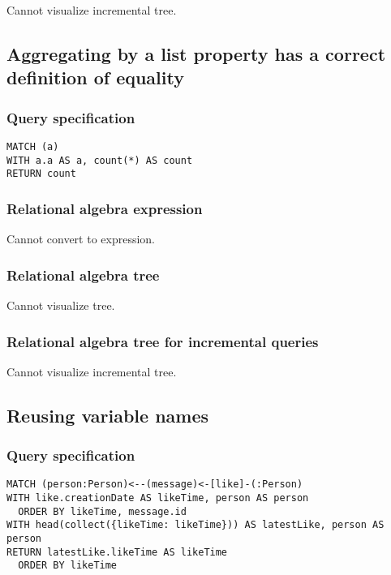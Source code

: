 Cannot visualize incremental tree.

\subsection{Aggregating by a list property has a correct definition of equality}

\subsubsection*{Query specification}

\begin{lstlisting}
MATCH (a)
WITH a.a AS a, count(*) AS count
RETURN count
\end{lstlisting}

\subsubsection*{Relational algebra expression}

Cannot convert to expression.

\subsubsection*{Relational algebra tree}

Cannot visualize tree.

\subsubsection*{Relational algebra tree for incremental queries}

Cannot visualize incremental tree.

\subsection{Reusing variable names}

\subsubsection*{Query specification}

\begin{lstlisting}
MATCH (person:Person)<--(message)<-[like]-(:Person)
WITH like.creationDate AS likeTime, person AS person
  ORDER BY likeTime, message.id
WITH head(collect({likeTime: likeTime})) AS latestLike, person AS person
RETURN latestLike.likeTime AS likeTime
  ORDER BY likeTime
\end{lstlisting}

